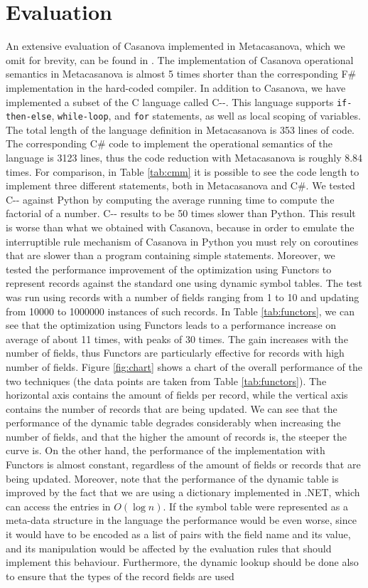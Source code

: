 \section{Evaluation}
An extensive evaluation of Casanova implemented in Metacasanova, which we omit for brevity, can be found in \cite{DiGiacomo2017}. The implementation of Casanova operational semantics in Metacasanova is almost 5 times shorter than the corresponding F\# implementation in the hard-coded compiler. In addition to Casanova, we have implemented a subset of the C language called C-{}-. This language supports \texttt{if-then-else}, \texttt{while-loop}, and \texttt{for} statements, as well as local scoping of variables. The total length of the language definition in Metacasanova is 353 lines of code. The corresponding C\# code to implement the operational semantics of the language is 3123 lines, thus the code reduction with Metacasanova is roughly 8.84 times. For comparison, in Table \ref{tab:cmm} it is possible to see the code length to implement three different statements, both in Metacasanova and C\#. We tested C-{}- against Python by computing the average running time to compute the factorial of a number. C-{}- results to be 50 times slower than Python. This result is worse than what we obtained with Casanova, because in order to emulate the interruptible rule mechanism of Casanova in Python you must rely on coroutines that are slower than a program containing simple statements. Moreover, we tested the performance improvement of the optimization using Functors to represent records against the standard one using dynamic symbol tables. The test was run using records with a number of fields ranging from 1 to 10 and updating from 10000 to 1000000 instances of such records. In Table \ref{tab:functors}, we can see that the optimization using Functors leads to a performance increase on average of about 11 times, with peaks of 30 times. The gain increases with the number of fields, thus Functors are particularly effective for records with high number of fields. Figure \ref{fig:chart} shows a chart of the overall performance of the two techniques (the data points are taken from Table \ref{tab:functors}). The horizontal axis contains the amount of fields per record, while the vertical axis contains the number of records that are being updated. We can see that the performance of the dynamic table degrades considerably when increasing the number of fields, and that the higher the amount of records is, the steeper the curve is. On the other hand, the performance of the implementation with Functors is almost constant, regardless of the amount of fields or records that are being updated. Moreover, note that the performance of the dynamic table is improved by the fact that we are using a dictionary implemented in .NET, which can access the entries in $O(\log n)$. If the symbol table were represented as a meta-data structure in the language the performance would be even worse, since it would have to be encoded as a list of pairs with the field name and its value, and its manipulation would be affected by the evaluation rules that should implement this behaviour. Furthermore, the dynamic lookup should be done also to ensure that the types of the record fields are used 